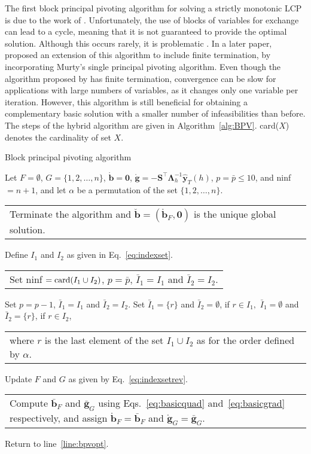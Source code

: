 \documentclass[twocolumn]{svjour3}
\makeatletter
\newcommand{\multiline}[1]{%
	\begin{tabularx}{\dimexpr\linewidth-\ALG@thistlm}[t]{@{}X@{}}
		#1
	\end{tabularx}
}
\makeatother
\begin{document}
The first block principal pivoting algorithm for solving a strictly monotonic LCP is due to the work of \citet{Kost1978}. Unfortunately, the use of blocks of variables for exchange can lead to a cycle, meaning that it is not guaranteed to provide the optimal solution. Although this occurs rarely, it is problematic \citep{Judice1989}. In a later paper, \citet{Judice1994} proposed an extension of this algorithm to include finite termination, by incorporating Murty's single principal pivoting algorithm. Even though the algorithm proposed by \citet{Murty1974} has finite termination, convergence can be slow for applications with large numbers of variables, as it changes only one variable per iteration. However, this algorithm is still beneficial for obtaining a complementary basic solution with a smaller number of infeasibilities than before. The steps of the hybrid algorithm are given in Algorithm~\ref{alg:BPV}. card($X$) denotes the cardinality of set $X$.

\begin{algorithm}
	\caption{Block principal pivoting algorithm}
	\label{alg:BPV}
	\begin{spacing}{1.3}
		\begin{algorithmic}[1]
			\Require Let $F = \emptyset$, $G = \{1, 2, \dots, n\}$, $\mathring{\bm{b}} = \bm{0}$, $\mathring{\bm{g}} = -\bm{S}^\top\bm{\Lambda}_{h}^{-1}\hat{\bm{y}}_{T}(h)$, $p = \bar{p} \leq 10$, and ninf $= n + 1$, and let $\alpha$ be a permutation of the set $\{1, 2, \dots, n\}$.
			 \label{line:bpvopt}
			\State \multiline{Terminate the algorithm and $\breve{\bm{b}} = (\mathring{\bm{b}}_{F}, \bm{0})$ is the unique global solution.}
			\Else{}
			\State Define $I_{1}$ and $I_{2}$ as given in Eq.~\eqref{eq:indexset}.
			\State \multiline{Set ninf $= \textnormal{card}(I_{1} \cup I_{2})$, $p = \bar{p}$, $\bar{I}_{1} = I_{1}$ and $\bar{I}_{2} = I_{2}$.}
			\State Set $p = p - 1$, $\bar{I}_{1} = I_{1}$ and $\bar{I}_{2} = I_{2}$.
			\State Set $\bar{I}_{1} = \{r\}$ and $\bar{I}_{2} = \emptyset$, if $r \in I_{1},$
			\State \hspace{5.3mm} $\bar{I}_{1} = \emptyset $ and $\bar{I}_{2} = \{r\}$, if $r \in I_{2}$,
			\State \multiline{where $r$ is the last element of the set $I_{1} \cup I_{2}$ as for the order defined by $\alpha$.}
			\EndIf
			\State Update $F$ and $G$ as given by Eq.~\eqref{eq:indexsetrev}.
			\State \multiline{Compute $\bar{\bm{b}}_{F}$ and $\bar{\bm{g}}_{G}$ using Eqs.~\eqref{eq:basicquad} and~\eqref{eq:basicgrad} respectively, and assign $\mathring{\bm{b}}_{F} = \bar{\bm{b}}_{F}$ and $\mathring{\bm{g}}_{G} = \bar{\bm{g}}_{G}$.}
			\State Return to line~\ref{line:bpvopt}.
			\EndIf
		\end{algorithmic}
	\end{spacing}
\end{algorithm}
\end{document}
